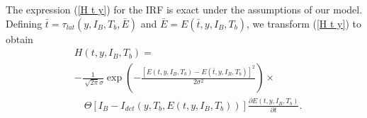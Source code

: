 \documentclass[%
reprint,
 amsmath,amssymb,
aps,
pra,
]{revtex4-1}
\begin{document}
\quad The expression (\ref{H t y}) for the IRF is exact under the assumptions of our model. Defining \(\bar{t} =  \tau_{lat}(y,I_B,T_b,\bar{E})\) and \(\bar{E} = E\left(\bar{t}, y,I_B,T_b\right)\), we transform (\ref{H t y}) to obtain
\begin{equation}\label{H t y 1}
\begin{aligned}
&H(t, y,I_B,T_b)= \\
&-\frac{1}{\sqrt[]{2\pi}\sigma}\exp\left(-\frac{\left[E\left(t, y,I_B,T_b\right) - E\left(\bar{t}, y,I_B,T_b\right)\right]^2}{2\sigma^2}\right)\times \\
&\quad\Theta\left[I_B-I_{det}(y,T_b,E\left(t, y,I_B,T_b\right))\right]\frac{\partial E\left(t, y,I_B,T_b\right)}{\partial t}\text{.}
\end{aligned}
\end{equation}
\end{document}
